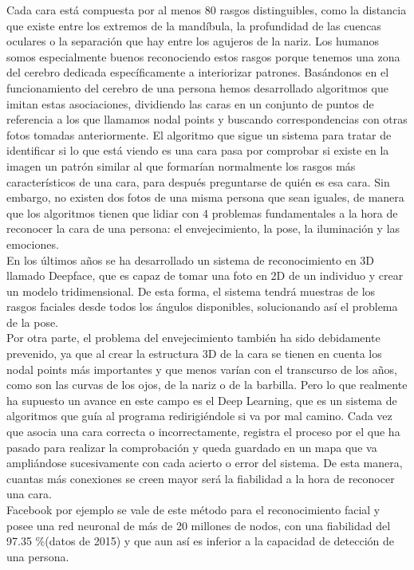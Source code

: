 Cada cara está compuesta por al menos 80 rasgos distinguibles, como la distancia que existe entre los extremos de la mandíbula, la profundidad de las cuencas oculares o la separación que hay entre los agujeros de la nariz. \cite{BBC_FacialRecognition}Los humanos somos especialmente buenos reconociendo estos rasgos porque tenemos una zona del cerebro dedicada específicamente a interiorizar patrones.
Basándonos en el funcionamiento del cerebro de una persona hemos desarrollado algoritmos que imitan estas asociaciones, dividiendo las caras en un conjunto de puntos de referencia a los que llamamos nodal points y buscando correspondencias con otras fotos tomadas anteriormente. El algoritmo que sigue un sistema para tratar de identificar si lo que está viendo es una cara pasa por comprobar si existe en la imagen un patrón similar al que formarían normalmente los rasgos más característicos de una cara, para después preguntarse de quién es esa cara. Sin embargo, no existen dos fotos de una misma persona que sean iguales, de manera que los algoritmos tienen que lidiar con 4 problemas fundamentales a la hora de reconocer la cara de una persona: el envejecimiento, la pose, la iluminación y las emociones.\\

En los últimos años se ha desarrollado un sistema de reconocimiento en 3D llamado Deepface, que es capaz de tomar una foto en 2D de un individuo y crear un modelo tridimensional. De esta forma, el sistema tendrá muestras de los rasgos faciales desde todos los ángulos disponibles, solucionando así el problema de la pose.\\

Por otra parte, el problema del envejecimiento también ha sido debidamente prevenido, ya que al crear la estructura 3D de la cara se tienen en cuenta los nodal points más importantes y que menos varían con el transcurso de los años, como son las curvas de los ojos, de la nariz o de la barbilla. Pero lo que realmente ha supuesto un avance en este campo es el Deep Learning, que es un sistema de algoritmos que guía al programa redirigiéndole si va por mal camino. Cada vez que asocia una cara correcta o incorrectamente, registra el proceso por el que ha pasado para realizar la comprobación y queda guardado en un mapa que va ampliándose sucesivamente con cada acierto o error del sistema. De esta manera, cuantas más conexiones se creen mayor será la fiabilidad a la hora de reconocer una cara.\\

Facebook por ejemplo se vale de este método para el reconocimiento facial y posee una red neuronal de más de 20 millones de nodos, con una fiabilidad del 97.35 \%(datos de 2015)\cite{Facebook_FacialRecognition} y que aun así es inferior a la capacidad de detección de una persona.\\\

